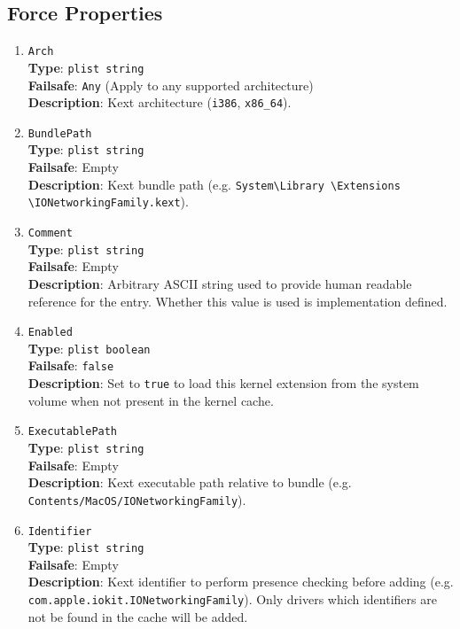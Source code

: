 \documentclass[]{article}
\begin{document}
\subsection{Force Properties}\label{kernelpropsforce}

\begin{enumerate}
\item
  \texttt{Arch}\\
  \textbf{Type}: \texttt{plist\ string}\\
  \textbf{Failsafe}: \texttt{Any} (Apply to any supported architecture)\\
  \textbf{Description}: Kext architecture (\texttt{i386}, \texttt{x86\_64}).

\item
  \texttt{BundlePath}\\
  \textbf{Type}: \texttt{plist\ string}\\
  \textbf{Failsafe}: Empty\\
  \textbf{Description}: Kext bundle path (e.g.
  \texttt{System\textbackslash Library \textbackslash Extensions \textbackslash IONetworkingFamily.kext}).

\item
  \texttt{Comment}\\
  \textbf{Type}: \texttt{plist\ string}\\
  \textbf{Failsafe}: Empty\\
  \textbf{Description}: Arbitrary ASCII string used to provide human readable
  reference for the entry. Whether this value is used is implementation defined.

\item
  \texttt{Enabled}\\
  \textbf{Type}: \texttt{plist\ boolean}\\
  \textbf{Failsafe}: \texttt{false}\\
  \textbf{Description}: Set to \texttt{true} to load this kernel extension from the
  system volume when not present in the kernel cache.

\item
  \texttt{ExecutablePath}\\
  \textbf{Type}: \texttt{plist\ string}\\
  \textbf{Failsafe}: Empty\\
  \textbf{Description}: Kext executable path relative to bundle
  (e.g. \texttt{Contents/MacOS/IONetworkingFamily}).

\item
  \texttt{Identifier}\\
  \textbf{Type}: \texttt{plist\ string}\\
  \textbf{Failsafe}: Empty\\
  \textbf{Description}: Kext identifier to perform presence checking
  before adding (e.g. \texttt{com.apple.iokit.IONetworkingFamily}).
  Only drivers which identifiers are not be found in the cache will be added.


\end{enumerate}
\end{document}
